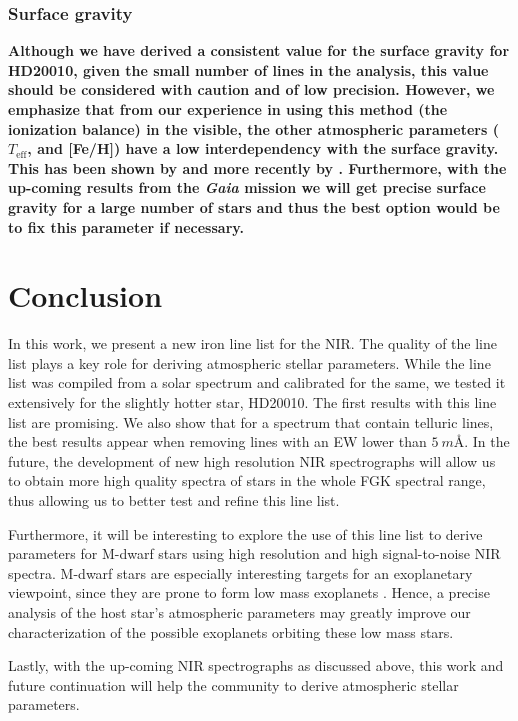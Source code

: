 \documentclass{aa}
\begin{document}
\subsubsection{Surface gravity}
\label{subs:surface_gravity}
\textbf{Although we have derived a consistent value for the surface gravity for
HD20010, given the small number of  lines in the analysis,
this value should be considered with caution and of low precision. However,
we emphasize that from our experience in using this method (the ionization
balance) in the visible, the other atmospheric parameters ($T_\mathrm{eff}$,
and [Fe/H]) have a low interdependency with the surface gravity. This has
been shown by \citet{Torres2012} and more recently by \citet{Mortier2014}.
Furthermore, with the up-coming results from the \emph{Gaia} mission we will
get precise surface gravity for a large number of stars and thus the best
option would be to fix this parameter if necessary.}


\section{Conclusion}
\label{sec:conclusion}

In this work, we present a new iron line list for the NIR. The quality
of the line list plays a key role for deriving atmospheric stellar
parameters. While the line list was compiled from a solar spectrum and
calibrated for the same, we tested it extensively for the slightly
hotter star, HD20010. The first results with this line list are
promising. We also show that for a spectrum that contain telluric
lines, the best results appear when removing lines with an EW lower
than $\SI{5}{m\angstrom}$. In the future, the development of new high
resolution NIR spectrographs will allow us to obtain more high quality
spectra of stars in the whole FGK spectral range, thus allowing us to
better test and refine this line list.

Furthermore, it will be interesting to explore the use of this line list
to derive parameters for M-dwarf stars using high resolution and high
signal-to-noise NIR spectra. M-dwarf stars are especially interesting
targets for an exoplanetary viewpoint, since they are prone to form
low mass exoplanets \citep{Bonfils2013}. Hence, a precise analysis
of the host star's atmospheric parameters may greatly improve our
characterization of the possible exoplanets orbiting these low mass
stars.

Lastly, with the up-coming NIR spectrographs as discussed above,
this work and future continuation will help the community to derive
atmospheric stellar parameters.
\end{document}
